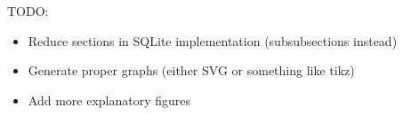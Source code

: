 \color{purple}
TODO:
\begin{itemize}
  \item Reduce sections in SQLite implementation (\eg subsubsections instead)
  \item Generate proper graphs (either SVG or something like tikz)
  \item Add more explanatory figures
\end{itemize}
